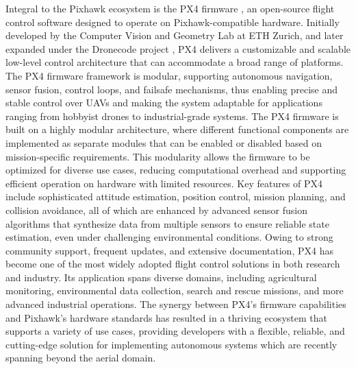 Integral to the Pixhawk ecosystem is the PX4 firmware \cite{meier_px4_2015}, an open-source flight control software designed to operate on Pixhawk-compatible hardware. Initially developed by the Computer Vision and Geometry Lab at ETH Zurich, and later expanded under the Dronecode project \cite{dronecode_foundation_dronecode_nodate}, PX4 delivers a customizable and scalable low-level control architecture that can accommodate a broad range of platforms. The PX4 firmware framework is modular, supporting autonomous navigation, sensor fusion, control loops, and failsafe mechanisms, thus enabling precise and stable control over UAVs and making the system adaptable for applications ranging from hobbyist drones to industrial-grade systems. The PX4 firmware is built on a highly modular architecture, where different functional components are implemented as separate modules that can be enabled or disabled based on mission-specific requirements. This modularity allows the firmware to be optimized for diverse use cases, reducing computational overhead and supporting efficient operation on hardware with limited resources. Key features of PX4 include sophisticated attitude estimation, position control, mission planning, and collision avoidance, all of which are enhanced by advanced sensor fusion algorithms that synthesize data from multiple sensors to ensure reliable state estimation, even under challenging environmental conditions. Owing to strong community support, frequent updates, and extensive documentation, PX4 has become one of the most widely adopted flight control solutions in both research and industry. Its application spans diverse domains, including agricultural monitoring, environmental data collection, search and rescue missions, and more advanced industrial operations. The synergy between PX4's firmware capabilities and Pixhawk's hardware standards has resulted in a thriving ecosystem that supports a variety of use cases, providing developers with a flexible, reliable, and cutting-edge solution for implementing autonomous systems which are recently spanning beyond the aerial domain.

